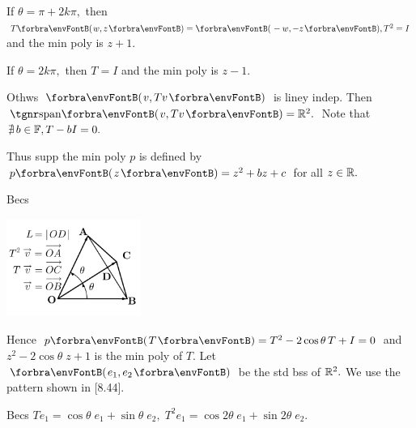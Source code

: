 \par\quad
If $\theta=\pi+2k\pi,$ then $T\Par{w,z}=\Par{-w,-z},T^2=I$ and the min poly is $z+1.$\par\quad
If $\theta=2k\pi,$ then $T=I$ and the min poly is $z-1.$\par\quad
Othws $\Par{v,Tv}$ is liney indep. Then $\Span{v,Tv}=\Rbb^2.$ Note that $\nexists\,b\in{\mathbb{F}},T-bI=0.$\par\quad
\par\vspace{-16pt}\quad
Thus supp the min poly $p$ is defined by $p\Par{z}=z^2+bz+c$ for all $z\in{\mathbb{R}}.$\par\vspace{20pt}\quad
Becs\vspace{-35pt}\par\quad
\hspace{50pt}\includegraphics[width=4.4cm,height=3.2cm,scale=0.22]{diagram5BI-1.png}\par\vspace{-70pt}\quad
{}\par\quad
Hence $p\Par{T}=T^2-2\cos\theta\, T+I=0$ and $z^2-2\cos\theta\;z+1$ is the min poly of $T.$\PfEnd\vspace{6pt}\quad
\Or Let $\Par{e_1,e_2}$ be the std bss of ${\mathbb{R}}^2.$ We use the pattern shown in [8.44].\par\quad
Becs $Te_1=\cos\theta\;e_1+\sin\theta\;e_2,\;T^2e_1=\cos2\theta\;e_1+\sin2\theta\;e_2.$\par\vspace{2pt}\quad
